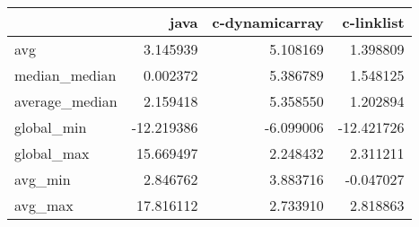 \begin{tabular}{lrrr}
\toprule
{} &       java &  c-dynamicarray &  c-linklist \\
\midrule
avg            &   3.145939 &        5.108169 &    1.398809 \\
median\_median  &   0.002372 &        5.386789 &    1.548125 \\
average\_median &   2.159418 &        5.358550 &    1.202894 \\
global\_min     & -12.219386 &       -6.099006 &  -12.421726 \\
global\_max     &  15.669497 &        2.248432 &    2.311211 \\
avg\_min        &   2.846762 &        3.883716 &   -0.047027 \\
avg\_max        &  17.816112 &        2.733910 &    2.818863 \\
\bottomrule
\end{tabular}
